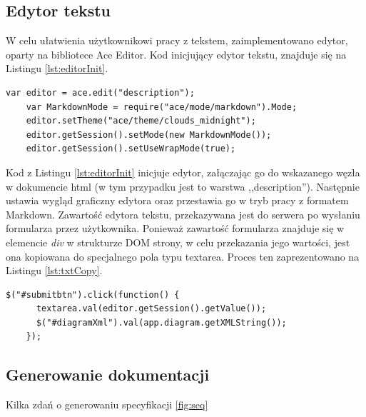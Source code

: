     \subsection{Edytor tekstu}
      W celu ułatwienia użytkownikowi pracy z tekstem, zaimplementowano edytor, oparty na bibliotece Ace Editor. 
      Kod inicjujący edytor tekstu, znajduje się na Listingu \ref{lst:editorInit}.

    \begin{lstlisting}[caption={Inicjalizacja edytora tekstu}, label={lst:editorInit}]
    var editor = ace.edit("description");
    var MarkdownMode = require("ace/mode/markdown").Mode;
    editor.setTheme("ace/theme/clouds_midnight");
    editor.getSession().setMode(new MarkdownMode());
    editor.getSession().setUseWrapMode(true);
    \end{lstlisting}

    Kod z Listingu \ref{lst:editorInit} inicjuje edytor, załączając go do wskazanego węzła w dokumencie html (w tym przypadku jest to warstwa ,,description''). Następnie ustawia wygląd graficzny edytora oraz przestawia go w tryb pracy z formatem Markdown.
    Zawartość edytora tekstu, przekazywana jest do serwera po wysłaniu formularza przez użytkownika. Ponieważ zawartość formularza znajduje się w elemencie \emph{div} w strukturze DOM strony, w celu przekazania jego wartości, jest ona kopiowana do specjalnego pola typu textarea. Proces ten zaprezentowano na Listingu \ref{lst:txtCopy}.

    \begin{lstlisting}[caption={Kopiowanie zawartości edytora tekstu do pola textarea}, label={lst:txtCopy}]
    $("#submitbtn").click(function() {
      textarea.val(editor.getSession().getValue()); 
      $("#diagramXml").val(app.diagram.getXMLString());
    });
    \end{lstlisting} 

    \subsection{Generowanie dokumentacji}
      
      Kilka zdań o generowaniu specyfikacji \ref{fig:seq}    
  
